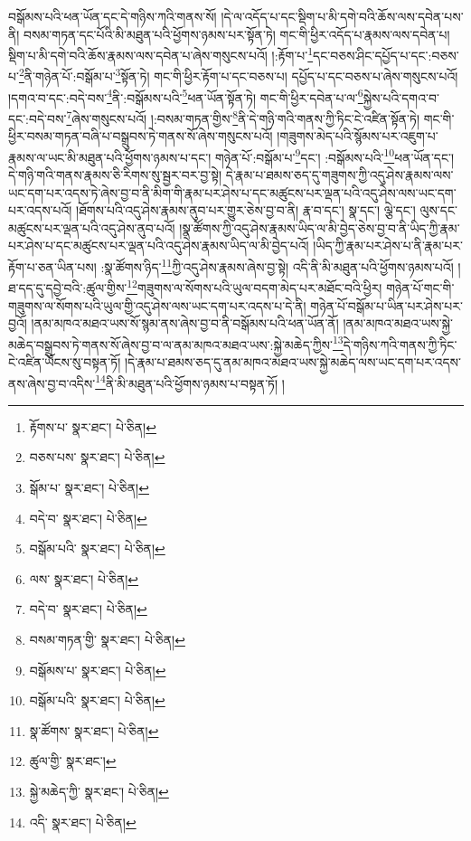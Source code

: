 བསྒོམས་པའི་ཕན་ཡོན་དང་དེ་གཉིས་ཀའི་གནས་སོ། །དེ་ལ་འདོད་པ་དང་སྡིག་པ་མི་དགེ་བའི་ཆོས་ལས་དབེན་པས་ནི། བསམ་གཏན་དང་པོའི་མི་མཐུན་པའི་ཕྱོགས་ཉམས་པར་སྟོན་ཏེ། གང་གི་ཕྱིར་འདོད་པ་རྣམས་ལས་དབེན་པ། སྡིག་པ་མི་དགེ་བའི་ཆོས་རྣམས་ལས་དབེན་པ་ཞེས་གསུངས་པའོ། །:རྟོག་པ་\footnote{རྟོགས་པ་  སྣར་ཐང་།  པེ་ཅིན། }དང་བཅས་ཤིང་དཔྱོད་པ་དང་:བཅས་པ་\footnote{བཅས་པས་  སྣར་ཐང་།  པེ་ཅིན། }ནི་གཉེན་པོ་:བསྒོམ་པ་\footnote{སྒོམ་པ་  སྣར་ཐང་།  པེ་ཅིན། }སྟོན་ཏེ། གང་གི་ཕྱིར་རྟོག་པ་དང་བཅས་པ། དཔྱོད་པ་དང་བཅས་པ་ཞེས་གསུངས་པའོ། །དགའ་བ་དང་:བདེ་བས་\footnote{བདེ་བ་  སྣར་ཐང་།  པེ་ཅིན། }ནི་:བསྒོམས་པའི་\footnote{བསྒོམ་པའི་  སྣར་ཐང་།  པེ་ཅིན། }ཕན་ཡོན་སྟོན་ཏེ། གང་གི་ཕྱིར་དབེན་པ་ལ་\footnote{ལས་  སྣར་ཐང་།  པེ་ཅིན། }སྐྱེས་པའི་དགའ་བ་དང་:བདེ་བས་\footnote{བདེ་བ་  སྣར་ཐང་།  པེ་ཅིན། }ཞེས་གསུངས་པའོ། །:བསམ་གཏན་གྱིས་\footnote{བསམ་གཏན་གྱི་  སྣར་ཐང་།  པེ་ཅིན། }ནི་དེ་གཉི་གའི་གནས་ཀྱི་ཏིང་ངེ་འཛིན་སྟོན་ཏེ། གང་གི་ཕྱིར་བསམ་གཏན་བཞི་པ་བསྒྲུབས་ཏེ་གནས་སོ་ཞེས་གསུངས་པའོ། །གཟུགས་མེད་པའི་སྙོམས་པར་འཇུག་པ་རྣམས་ལ་ཡང་མི་མཐུན་པའི་ཕྱོགས་ཉམས་པ་དང་། གཉེན་པོ་:བསྒོམ་པ་\footnote{བསྒོམས་པ་  སྣར་ཐང་།  པེ་ཅིན། }དང་། :བསྒོམས་པའི་\footnote{བསྒོམ་པའི་  སྣར་ཐང་།  པེ་ཅིན། }ཕན་ཡོན་དང་། དེ་གཉི་གའི་གནས་རྣམས་ཅི་རིགས་སུ་སྦྱར་བར་བྱ་སྟེ། དེ་རྣམ་པ་ཐམས་ཅད་དུ་གཟུགས་ཀྱི་འདུ་ཤེས་རྣམས་ལས་ཡང་དག་པར་འདས་ཏེ་ཞེས་བྱ་བ་ནི་མིག་གི་རྣམ་པར་ཤེས་པ་དང་མཚུངས་པར་ལྡན་པའི་འདུ་ཤེས་ལས་ཡང་དག་པར་འདས་པའོ། །ཐོགས་པའི་འདུ་ཤེས་རྣམས་ནུབ་པར་གྱུར་ཅེས་བྱ་བ་ནི། རྣ་བ་དང་། སྣ་དང་། ལྕེ་དང་། ལུས་དང་མཚུངས་པར་ལྡན་པའི་འདུ་ཤེས་ནུབ་པའོ། །སྣ་ཚོགས་ཀྱི་འདུ་ཤེས་རྣམས་ཡིད་ལ་མི་བྱེད་ཅེས་བྱ་བ་ནི་ཡིད་ཀྱི་རྣམ་པར་ཤེས་པ་དང་མཚུངས་པར་ལྡན་པའི་འདུ་ཤེས་རྣམས་ཡིད་ལ་མི་བྱེད་པའོ། །ཡིད་ཀྱི་རྣམ་པར་ཤེས་པ་ནི་རྣམ་པར་རྟོག་པ་ཅན་ཡིན་པས། :སྣ་ཚོགས་ཉིད་\footnote{སྣ་ཚོགས་  སྣར་ཐང་།  པེ་ཅིན། }ཀྱི་འདུ་ཤེས་རྣམས་ཞེས་བྱ་སྟེ། འདི་ནི་མི་མཐུན་པའི་ཕྱོགས་ཉམས་པའོ། །ཐ་དད་དུ་དབྱེ་བའི་:ཚུལ་གྱིས་\footnote{ཚུལ་གྱི་  སྣར་ཐང་། }གཟུགས་ལ་སོགས་པའི་ཡུལ་བདག་མེད་པར་མཐོང་བའི་ཕྱིར། གཉེན་པོ་གང་གི་གཟུགས་ལ་སོགས་པའི་ཡུལ་གྱི་འདུ་ཤེས་ལས་ཡང་དག་པར་འདས་པ་དེ་ནི། གཉེན་པོ་བསྒོམ་པ་ཡིན་པར་ཤེས་པར་བྱའོ། །ནམ་མཁའ་མཐའ་ཡས་སོ་སྙམ་ནས་ཞེས་བྱ་བ་ནི་བསྒོམས་པའི་ཕན་ཡོན་ནོ། །ནམ་མཁའ་མཐའ་ཡས་སྐྱེ་མཆེད་བསྒྲུབས་ཏེ་གནས་སོ་ཞེས་བྱ་བ་ལ་ནམ་མཁའ་མཐའ་ཡས་:སྐྱེ་མཆེད་ཀྱིས་\footnote{སྐྱེ་མཆེད་ཀྱི་  སྣར་ཐང་།  པེ་ཅིན། }དེ་གཉིས་ཀའི་གནས་ཀྱི་ཏིང་ངེ་འཛིན་ཡོངས་སུ་བསྟན་ཏོ། །དེ་རྣམ་པ་ཐམས་ཅད་དུ་ནམ་མཁའ་མཐའ་ཡས་སྐྱེ་མཆེད་ལས་ཡང་དག་པར་འདས་ནས་ཞེས་བྱ་བ་འདིས་\footnote{འདི་  སྣར་ཐང་།  པེ་ཅིན། }ནི་མི་མཐུན་པའི་ཕྱོགས་ཉམས་པ་བསྟན་ཏོ། །

